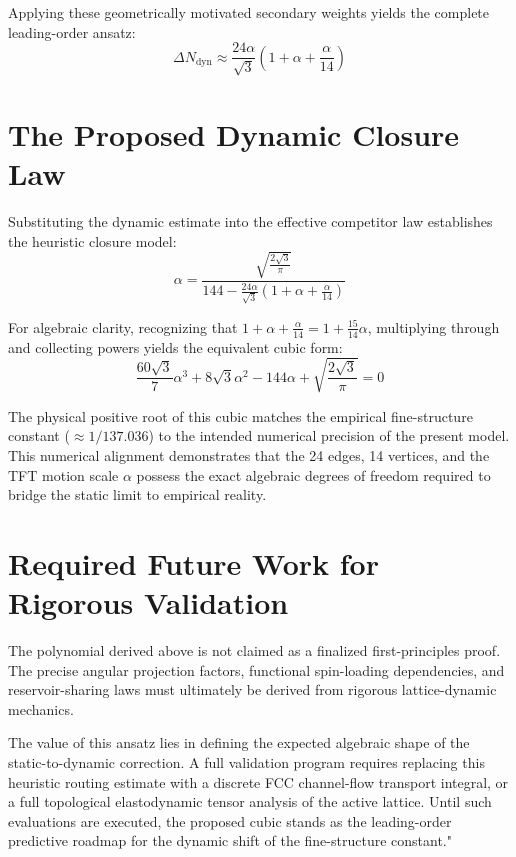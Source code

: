 Applying these geometrically motivated secondary weights yields the complete leading-order ansatz:
\begin{equation}
    \Delta N_{\mathrm{dyn}} \approx \frac{24\alpha}{\sqrt{3}} \left( 1 + \alpha + \frac{\alpha}{14} \right)
\end{equation}

\section{The Proposed Dynamic Closure Law}
Substituting the dynamic estimate into the effective competitor law establishes the heuristic closure model:
\begin{equation}
    \alpha = \frac{\sqrt{\frac{2\sqrt{3}}{\pi}}}{144 - \frac{24\alpha}{\sqrt{3}} \left( 1 + \alpha + \frac{\alpha}{14} \right)}
\end{equation}

For algebraic clarity, recognizing that $1 + \alpha + \frac{\alpha}{14} = 1 + \frac{15}{14}\alpha$, multiplying through and collecting powers yields the equivalent cubic form:
\begin{equation}
    \frac{60\sqrt{3}}{7} \alpha^3 + 8\sqrt{3} \alpha^2 - 144\alpha + \sqrt{\frac{2\sqrt{3}}{\pi}} = 0
\end{equation}

The physical positive root of this cubic matches the empirical fine-structure constant ($\approx 1/137.036$) to the intended numerical precision of the present model. This numerical alignment demonstrates that the 24 edges, 14 vertices, and the TFT motion scale $\alpha$ possess the exact algebraic degrees of freedom required to bridge the static limit to empirical reality.

\section{Required Future Work for Rigorous Validation}
The polynomial derived above is not claimed as a finalized first-principles proof. The precise angular projection factors, functional spin-loading dependencies, and reservoir-sharing laws must ultimately be derived from rigorous lattice-dynamic mechanics.

The value of this ansatz lies in defining the expected algebraic shape of the static-to-dynamic correction. A full validation program requires replacing this heuristic routing estimate with a discrete FCC channel-flow transport integral, or a full topological elastodynamic tensor analysis of the active lattice. Until such evaluations are executed, the proposed cubic stands as the leading-order predictive roadmap for the dynamic shift of the fine-structure constant."
